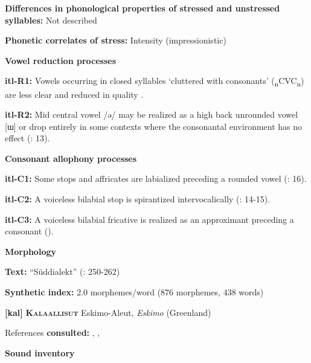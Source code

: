 \textbf{Differences in phonological properties of stressed and unstressed syllables:} Not described



\textbf{Phonetic correlates of stress:} Intensity (impressionistic)



\textbf{Vowel reduction processes}



\textbf{itl-R1:} Vowels occurring in closed syllables ‘cluttered with consonants’ (\textsubscript{n}CVC\textsubscript{n}) are less clear and reduced in quality \citep[73]{Volodin1976}.



\textbf{itl-R2:} Mid central vowel /ə/ may be realized as a high back unrounded vowel [ɯ] or drop entirely in some contexts where the consonantal environment has no effect (\citealt{GeorgVolodin1999}: 13).



\textbf{Consonant allophony processes}



\textbf{itl-C1:} Some stops and affricates are labialized preceding a rounded vowel (\citealt{GeorgVolodin1999}: 16).



\textbf{itl-C2:} A voiceless bilabial stop is spirantized intervocalically (\citealt{GeorgVolodin1999}: 14-15).



\textbf{itl-C3:} A voiceless bilabial fricative is realized as an approximant preceding a consonant (\citealt{GeorgVolodin1999}).



\textbf{Morphology}



\textbf{Text:} “Süddialekt” (\citealt{GeorgVolodin1999}: 250-262)



\textbf{Synthetic index:} 2.0 morphemes/word (876 morphemes, 438 words)



\textbf{[kal]}   \textbf{\textsc{Kalaallisut}}    Eskimo-Aleut, \textit{Eskimo} (Greenland)



References \textbf{consulted:} \citet{Fortescue1984}, \citet{Hagerup2011}, \citet{Jacobsen2000}



\textbf{Sound inventory}



